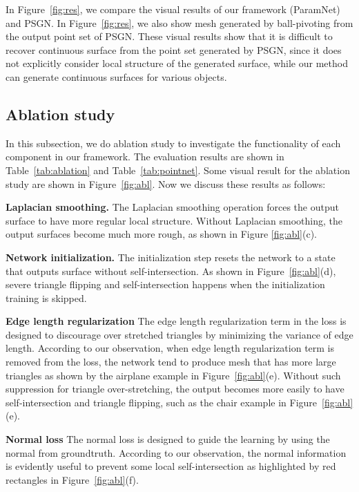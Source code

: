 In Figure~\ref{fig:res}, we compare the visual results of our framework (ParamNet) and PSGN\cite{PSGN}. In Figure~\ref{fig:res}, we also show mesh generated by ball-pivoting\cite{ballpivot} from the output point set of PSGN\cite{PSGN}. 
These visual results show that it is difficult to recover continuous surface from the point set generated by PSGN\cite{PSGN}, since it does not explicitly consider local structure of the generated surface, while our method can generate continuous surfaces for various objects.

\subsection{Ablation study}
In this subsection, we do ablation study to investigate the functionality of each component in our framework. The evaluation results are shown in Table~\ref{tab:ablation} and Table~\ref{tab:pointnet}. Some visual result for the ablation study are shown in Figure~\ref{fig:abl}. Now we discuss these results as follows:

\noindent\textbf{Laplacian smoothing.}
The Laplacian smoothing operation forces the output surface to have more regular local structure. 
Without Laplacian smoothing, the output surfaces become much more rough, as shown in Figure \ref{fig:abl}(c).


\noindent\textbf{Network initialization.}
The initialization step resets the network to a state that outputs surface without self-intersection. 
As shown in Figure~\ref{fig:abl}(d), severe triangle flipping and self-intersection happens when the initialization training is skipped.

\noindent\textbf{Edge length regularization}
The edge length regularization term in the loss is designed to discourage over stretched triangles by minimizing the variance of edge length. According to our observation, when edge length regularization term is removed from the loss, the network tend to produce mesh that has more large triangles as shown by the airplane example in Figure~\ref{fig:abl}(e). 
Without such suppression for triangle over-stretching, the output becomes more easily to have self-intersection and triangle flipping, such as the chair example in Figure~\ref{fig:abl}(e).

\noindent\textbf{Normal loss}
The normal loss is designed to guide the learning by using the normal from groundtruth. According to our observation, the normal information is evidently useful to prevent some local self-intersection as highlighted by red rectangles in Figure~\ref{fig:abl}(f).

